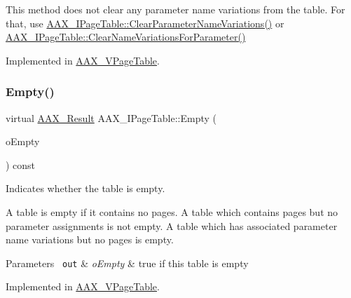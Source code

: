 This method does not clear any parameter name variations from the table. For that, use \mbox{\hyperlink{a01849_a6af3965eaf2baeadef9a44aa9c77ecbb}{A\+A\+X\+\_\+\+I\+Page\+Table\+::\+Clear\+Parameter\+Name\+Variations()}} or \mbox{\hyperlink{a01849_ae6cf05c366d982e8ea92fea1d98f1d22}{A\+A\+X\+\_\+\+I\+Page\+Table\+::\+Clear\+Name\+Variations\+For\+Parameter()}} 

Implemented in \mbox{\hyperlink{a01929_aacd53ddee67cffcd326c66a4f8fcd1aa}{A\+A\+X\+\_\+\+V\+Page\+Table}}.

\mbox{\label{a01849_a6953bc99853c741500f5619b8e675c30}} 
\subsubsection{\texorpdfstring{Empty()}{Empty()}}
{\footnotesize\ttfamily virtual \mbox{\hyperlink{a00392_a4d8f69a697df7f70c3a8e9b8ee130d2f}{A\+A\+X\+\_\+\+Result}} A\+A\+X\+\_\+\+I\+Page\+Table\+::\+Empty (\begin{DoxyParamCaption}\item[{\mbox{\hyperlink{a00392_aa216506530f1d19a2965931ced2b274b}{A\+A\+X\+\_\+\+C\+Boolean}} \&}]{o\+Empty }\end{DoxyParamCaption}) const\hspace{0.3cm}{\ttfamily [pure virtual]}}



Indicates whether the table is empty. 

A table is empty if it contains no pages. A table which contains pages but no parameter assignments is not empty. A table which has associated parameter name variations but no pages is empty.


\begin{DoxyParams}[1]{Parameters}
\mbox{\texttt{ out}}  & {\em o\+Empty} & {\ttfamily true} if this table is empty \\
\hline
\end{DoxyParams}


Implemented in \mbox{\hyperlink{a01929_af6f96732f058f79df4c05cadb8e4ceef}{A\+A\+X\+\_\+\+V\+Page\+Table}}.

\mbox{\label{a01849_a663a8c380ff8f8234fcabb8e8619ac7d}} 
